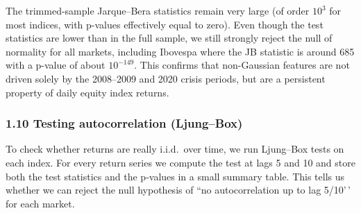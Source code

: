 \documentclass[11pt]{article}
\begin{document}
    The trimmed-sample Jarque--Bera statistics remain very large (of order
\(10^3\) for most indices, with p-values effectively equal to zero).
Even though the test statistics are lower than in the full sample, we
still strongly reject the null of normality for all markets, including
Ibovespa where the JB statistic is around 685 with a p-value of about
\(10^{-149}\). This confirms that non-Gaussian features are not driven
solely by the 2008--2009 and 2020 crisis periods, but are a persistent
property of daily equity index returns.

    \hypertarget{testing-autocorrelation-ljungbox}{%
\subsubsection{1.10 Testing autocorrelation
(Ljung--Box)}\label{testing-autocorrelation-ljungbox}}

To check whether returns are really i.i.d.~over time, we run Ljung--Box
tests on each index. For every return series we compute the test at lags
5 and 10 and store both the test statistics and the p-values in a small
summary table. This tells us whether we can reject the null hypothesis
of ``no autocorrelation up to lag 5/10'\,' for each market.
\end{document}
